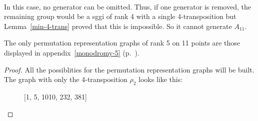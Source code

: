 \paragraph{}
In this case, no generator can be omitted. Thus, if one generator is removed, the remaining group would be a sggi of rank 4 with a single 4-transposition but Lemma~\ref{min-4-trans} proved that this is impossible. So it cannot generate $A_{11}$.

\begin{theorem}
  The only permutation representation graphs of rank 5 on 11 points are those displayed in appendix~\ref{monodromy-5} (p.~\pageref{monodromy-5}).
\end{theorem}

\begin{proof}
  All the possiblities for the permutation representation graphs will be built. The graph with only the 4-transposition $\rho_2$ looks like this:

  \begin{figure}[H]
    \begin{center}
      \caption{[1, 5, 1010, 232, 381]}
    \end{center}
  \end{figure}


\end{proof}
